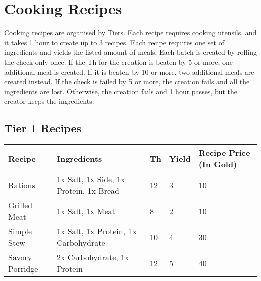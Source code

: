\section{Cooking Recipes}\label{sec:cookingRecipes}
Cooking recipes are organised by Tiers.
Each recipe requires cooking utensils, and it takes 1 hour to create up to 3 recipes.
Each recipe requires one set of ingredients and yields the listed amount of meals.
Each batch is created by rolling the check only once.
If the Th for the creation is beaten by 5 or more, one additional meal is created.
If it is beaten by 10 or more, two additional meals are created instead.
If the check is failed by 5 or more, the creation fails and all the ingredients are lost.
Otherwise, the creation fails and 1 hour passes, but the creator keeps the ingredients.\\


\subsection{Tier 1 Recipes}
\begin{longtable}{l | p{2.5cm} | l | p{1cm} | p{1cm} }
	Recipe & Ingredients & Th & Yield & Recipe Price (In Gold)\\ \hline
	Rations & 1x Salt, 1x Side, 1x Protein, 1x Bread & 12 & 3 & 10\\
	Grilled Meat & 1x Salt, 1x Meat & 8 & 2 & 10\\
	Simple Stew & 1x Salt, 1x Protein, 1x Carbohydrate & 10 & 4 & 30\\
	Savory Porridge & 2x Carbohydrate, 1x Protein & 12 & 5 & 40\\
\end{longtable}
